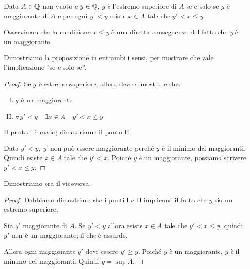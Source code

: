 \begin{proposition}
Dato $A \in \mathbb Q$ non vuoto e $y \in \mathbb Q$, $y$ è l'estremo superiore di $A$ se e solo se $y$ è maggiorante di $A$ e per ogni $y' < y$ esiste $x \in A$ tale che $y' < x \le y$.
\end{proposition}

Osserviamo che la condizione $x \le y$ è una diretta conseguenza del fatto che $y$ è un maggiorante.

Dimostriamo la proposizione in entrambi i sensi, per mostrare che vale l'implicazione ``se e solo se''.

\begin{proof}
Se $y$ è estremo superiore, allora devo dimostrare che:
\begin{enumerate}[I.]
\item $y$ è un maggiorante
\item $\forall y' < y \quad \exists x \in A \quad y' < x \le y$
\end{enumerate}
Il punto I è ovvio; dimostriamo il punto II.

Dato $y' < y$, $y'$ non può essere maggiorante perché $y$ è il minimo dei maggioranti. Quindi esiste $x \in A$ tale che $y' < x$. Poiché $y$ è un maggiorante, possiamo scrivere $y' < x \le y$.
\end{proof}

Dimostriamo ora il viceversa.

\begin{proof}
Dobbiamo dimostriare che i punti I e II implicano il fatto che $y$ sia un estremo superiore.

Sia $y'$ maggiorante di $A$. Se $y' < y$ allora esiste $x \in A$ tale che $y' < x \le y$, quindi $y'$ non è un maggiorante; il che è assurdo.

Allora ogni maggiorante $y'$ deve essere $y' \ge y$. Poiché $y$ è un maggiorante, $y$ è il minimo dei maggioranti. Quindi $y = \sup A$.
\end{proof}

